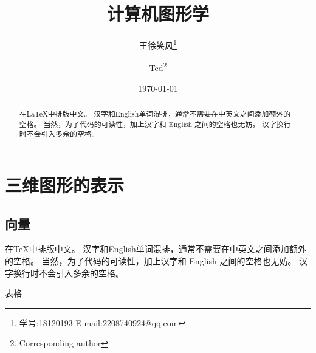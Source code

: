 \documentclass[12pt,oneside,a4paper]{ctexart}
\begin{document}
\title{计算机图形学}
\author{ 王徐笑风\thanks{学号:18120193 E-mail:2208740924@qq.com}
	\and Ted\thanks{Corresponding author}}
\date{\today}
\maketitle
\newpage
\tableofcontents
\newpage
\begin{abstract}
	在\LaTeX{}中排版中文。
	汉字和English单词混排，通常不需要在中英文之间添加额外的空格。
	当然，为了代码的可读性，加上汉字和 English 之间的空格也无妨。
	汉字换行时不会引入多余的空格。
\end{abstract}

\section{三维图形的表示}
\subsection{向量}
在\TeX{}中排版中文。
汉字和English单词混排，通常不需要在中英文之间添加额外的空格。
当然，为了代码的可读性，加上汉字和 English 之间的空格也无妨。
汉字换行时不会引入多余的空格。

表格
\end{document}
